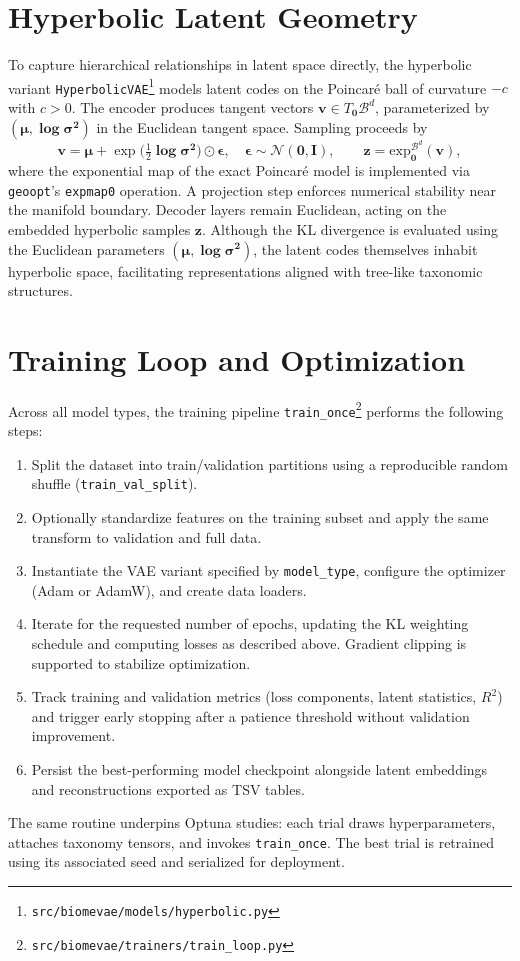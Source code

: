 \documentclass[11pt]{article}
\begin{document}
\section{Hyperbolic Latent Geometry}
To capture hierarchical relationships in latent space directly, the hyperbolic variant
\texttt{HyperbolicVAE}\footnote{\texttt{src/biomevae/models/hyperbolic.py}} models latent
codes on the Poincar\'e ball of curvature $-c$ with $c>0$. The encoder produces tangent
vectors $\bm{v} \in T_{\bm{0}}\mathcal{B}^d$, parameterized by $(\bm{\mu},\bm{\log\sigma^2})$ in the
Euclidean tangent space. Sampling proceeds by
\begin{equation}
    \bm{v} = \bm{\mu} + \exp\bigl(\tfrac{1}{2}\bm{\log\sigma^2}\bigr) \odot \bm{\epsilon},
    \quad \bm{\epsilon} \sim \mathcal{N}(\bm{0}, \mathbf{I}),
    \qquad \bm{z} = \mathrm{exp}_{\bm{0}}^{\mathcal{B}^d}(\bm{v}),
\end{equation}
where the exponential map of the exact Poincar\'e model is implemented via
\texttt{geoopt}'s \texttt{expmap0} operation. A projection step enforces numerical
stability near the manifold boundary. Decoder layers remain Euclidean, acting on the
embedded hyperbolic samples $\bm{z}$. Although the KL divergence is evaluated using the
Euclidean parameters $(\bm{\mu},\bm{\log\sigma^2})$, the latent codes themselves inhabit
hyperbolic space, facilitating representations aligned with tree-like taxonomic
structures.
\section{Training Loop and Optimization}
Across all model types, the training pipeline \texttt{train\_once}\footnote{\texttt{src/biomevae/trainers/train\_loop.py}}
performs the following steps:
\begin{enumerate}[label=\arabic*., leftmargin=*]
    \item Split the dataset into train/validation partitions using a reproducible random
    shuffle (\texttt{train\_val\_split}).
    \item Optionally standardize features on the training subset and apply the same
    transform to validation and full data.
    \item Instantiate the VAE variant specified by \texttt{model\_type}, configure the
    optimizer (Adam or AdamW), and create data loaders.
    \item Iterate for the requested number of epochs, updating the KL weighting schedule
    and computing losses as described above. Gradient clipping is supported to stabilize
    optimization.
    \item Track training and validation metrics (loss components, latent statistics,
    $R^2$) and trigger early stopping after a patience threshold without validation
    improvement.
    \item Persist the best-performing model checkpoint alongside latent embeddings and
    reconstructions exported as TSV tables.
\end{enumerate}
The same routine underpins Optuna studies: each trial draws hyperparameters, attaches
taxonomy tensors, and invokes \texttt{train\_once}. The best trial is retrained using
its associated seed and serialized for deployment.
\end{document}
